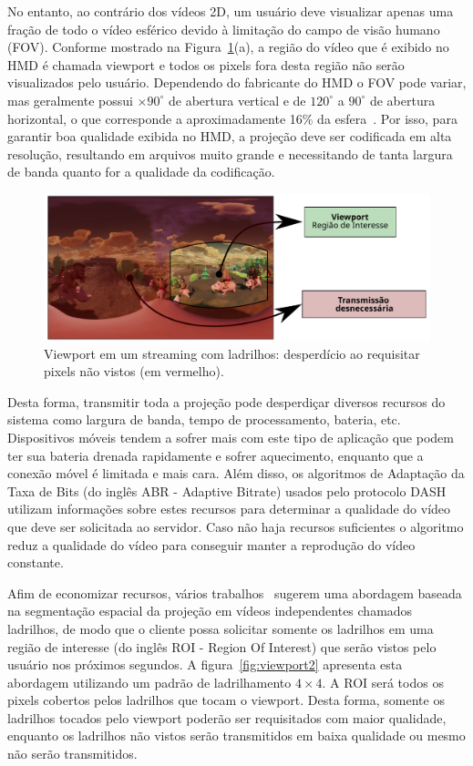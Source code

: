 No entanto, ao contrário dos vídeos 2D, um usuário deve visualizar apenas uma fração de todo o vídeo esférico devido à limitação do campo de visão humano (FOV). Conforme mostrado na Figura~\ref{fig:viewport1}(a), a região do vídeo que é exibido no HMD é chamada viewport e todos os pixels fora desta região não serão visualizados pelo usuário. Dependendo do fabricante do HMD o FOV pode variar, mas geralmente possui $\times90^{\circ}$ de abertura vertical e de $120^{\circ}$ a $90^{\circ}$ de abertura horizontal, o que corresponde a aproximadamente 16\% da esfera~\cite{Afzal2017}. Por isso, para garantir boa qualidade exibida no HMD, a projeção deve ser codificada em alta resolução, resultando em arquivos muito grande e necessitando de tanta largura de banda quanto for a qualidade da codificação. 

\begin{figure}[htb]
        \centering
        \includegraphics[width=0.80\columnwidth]{fig/viewport1.pdf}
        \caption{Viewport em um streaming com ladrilhos: desperdício ao requisitar pixels não vistos (em vermelho).}
        \label{fig:viewport1}
\end{figure}

Desta forma, transmitir toda a projeção pode desperdiçar diversos recursos do sistema como largura de banda, tempo de processamento, bateria, etc. Dispositivos móveis tendem a sofrer mais com este tipo de aplicação que podem ter sua bateria drenada rapidamente e sofrer aquecimento, enquanto que a conexão móvel é limitada e mais cara. Além disso, os algoritmos de Adaptação da Taxa de Bits (do inglês ABR - Adaptive Bitrate) usados pelo protocolo DASH utilizam informações sobre estes recursos para determinar a qualidade do vídeo que deve ser solicitada ao servidor. Caso não haja recursos suficientes o algoritmo reduz a qualidade do vídeo para conseguir manter a reprodução do vídeo constante.

Afim de economizar recursos, vários trabalhos~\cite{Alface2012, Zare2016, Qian2018, Liu2017, Graf2017, Xiao2018, Nasrabadi2019} sugerem uma abordagem baseada na segmentação espacial da projeção em vídeos independentes chamados ladrilhos, de modo que o cliente possa solicitar somente os ladrilhos em uma região de interesse (do inglês ROI - Region Of Interest) que serão vistos pelo usuário nos próximos segundos. A figura~\ref{fig:viewport2} apresenta esta abordagem utilizando um padrão de ladrilhamento $4 \times 4$. A ROI será todos os pixels cobertos pelos ladrilhos que tocam o viewport. Desta forma, somente os ladrilhos tocados pelo viewport poderão ser requisitados com maior qualidade, enquanto os ladrilhos não vistos serão transmitidos em baixa qualidade ou mesmo não serão transmitidos. 

